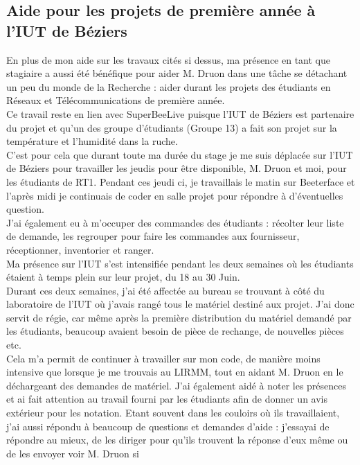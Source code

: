\documentclass[11pt,french,a4paper]{report}
\begin{document}
        \subsection{Aide pour les projets de première année à l'IUT de Béziers}
En plus de mon aide sur les travaux cités si dessus, ma présence en tant que stagiaire a aussi été bénéfique pour aider M. Druon 
dans une tâche se détachant un peu du monde de la Recherche : aider durant les projets des étudiants en Réseaux et Télécommunications 
de première année. \\
Ce travail reste en lien avec SuperBeeLive puisque l'IUT de Béziers est partenaire du projet et qu'un des groupe d'étudiants (Groupe 13) 
a fait son projet sur la température et l'humidité dans la ruche. \\
C'est pour cela que durant toute ma durée du stage je me suis déplacée sur l'IUT de Béziers pour travailler les jeudis pour être
disponible, M. Druon et moi, pour les étudiants de RT1. Pendant ces jeudi ci, je travaillais le matin sur Beeterface et 
l'après midi je continuais de coder en salle projet pour répondre à d'éventuelles question. \\
J'ai également eu à m'occuper des commandes des étudiants : récolter leur liste de demande, les regrouper pour faire les commandes
aux fournisseur, réceptionner, inventorier et ranger. \\
Ma présence sur l'IUT s'est intensifiée pendant les deux semaines où les étudiants étaient à temps plein sur leur projet, du 18 au 30 Juin. \\
Durant ces deux semaines, j'ai été affectée au bureau se trouvant à côté du laboratoire de l'IUT où j'avais rangé tous le matériel 
destiné aux projet.
J'ai donc servit de régie, car même après la première distribution du matériel demandé par les étudiants, beaucoup avaient 
besoin de pièce de rechange, de nouvelles pièces etc. \\
Cela m'a permit de continuer à travailler sur mon code, de manière moins intensive que lorsque je me trouvais au LIRMM, tout en
aidant M. Druon en le déchargeant des demandes de matériel. 
J'ai également aidé à noter les présences et ai fait attention au travail fourni par les étudiants afin de donner un avis extérieur pour
les notation.
Etant souvent dans les couloirs où ils travaillaient, j'ai aussi répondu à beaucoup de questions et demandes d'aide : 
j'essayai de répondre au mieux, de les diriger pour qu'ils trouvent la réponse d'eux même ou de les envoyer voir M. Druon si 
\end{document}
